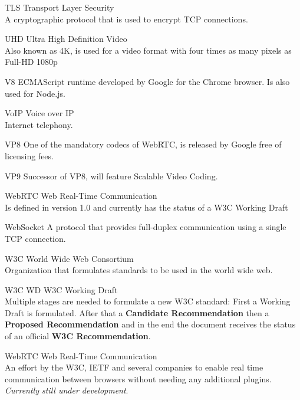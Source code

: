 \documentclass[../thesis.tex]{subfiles}
\begin{document}
\begin{abbreviations}
\item[TLS] Transport Layer Security \\A cryptographic protocol that is used to encrypt TCP connections.
\item[UHD] Ultra High Definition Video \\Also known as 4K, is used for a video format with four times as many pixels as Full-HD 1080p
\item[V8] ECMAScript runtime developed by Google for the Chrome browser. Is also used for Node.js.
\item[VoIP] Voice over IP \\Internet telephony.
\item[VP8] One of the mandatory codecs of WebRTC, is released by Google free of licensing fees.
\item[VP9] Successor of VP8, will feature Scalable Video Coding.
\item[WebRTC] Web Real-Time Communication \\Is defined in version 1.0 and currently has the status of a W3C Working Draft
\item[WebSocket] A protocol that provides full-duplex communication using a single TCP connection.
\item[W3C] World Wide Web Consortium \\Organization that formulates standards to be used in the world wide web.
\item[W3C WD] W3C Working Draft \\Multiple stages are needed to formulate a new W3C standard: First a Working Draft is formulated. After that a \textbf{Candidate Recommendation} then a \textbf{Proposed Recommendation} and in the end the document receives the status of an official \textbf{W3C Recommendation}.
\item[WebRTC] Web Real-Time Communication \\An effort by the W3C, IETF and several companies to enable real time communication between browsers without needing any additional plugins. \textit{Currently still under development}.
\end{abbreviations}
\end{document}
